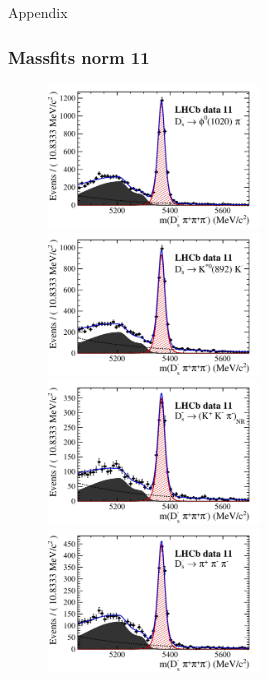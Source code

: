 \documentclass[]{beamer}
\begin{document}
\appendix 
\addtocounter{framenumber}{-1} 

\begin{frame}
\thispagestyle{empty}
\bfseries\Huge

\begin{center}
Appendix
\end{center}

\normalfont

\end{frame}


\begin{frame}
\frametitle{Massfits norm 11}

\begin{figure}[h]
\includegraphics[height=!,width=0.5\textwidth]{plots/norm_y11_phipi.pdf}
\includegraphics[height=!,width=0.5\textwidth]{plots/norm_y11_KsK.pdf}\\
\includegraphics[height=!,width=0.5\textwidth]{plots/norm_y11_KKpi_NR.pdf}
\includegraphics[height=!,width=0.5\textwidth]{plots/norm_y11_pipipi.pdf}
\end{figure}

\end{frame}
\end{document}
